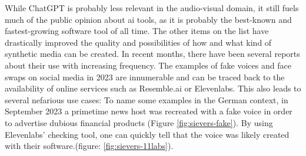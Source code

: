 \documentclass[
  a4paper,  %
  twoside,  %
  bibliography=totoc,
  headsepline,
  cleardoublepage=empty,
  parskip=half,
  draft=false
]{scrbook}
\begin{document}
While ChatGPT is probably less relevant in the audio-visual domain, it still fuels much of the public opinion about \gls{ai} tools, as it is probably the best-known and fastest-growing software tool of all time. The other items on the list have drastically improved the quality and possibilities of how and what kind of synthetic media can be created. In recent months, there have been several reports about their use with increasing frequency. The examples of fake voices and face swaps on social media in 2023 are innumerable and can be traced back to the availability of online services such as Resemble.ai or Elevenlabs. This also leads to several nefarious use cases: To name some examples in the German context, in September 2023 a primetime news host was recreated with a fake voice in order to advertise dubious financial products (Figure \ref{fig:sievers-fake}). By using Elevenlabs' checking tool, one can quickly tell that the voice was likely created with their software.(figure: \ref{fig:sievers-11labs}). 
\end{document}
